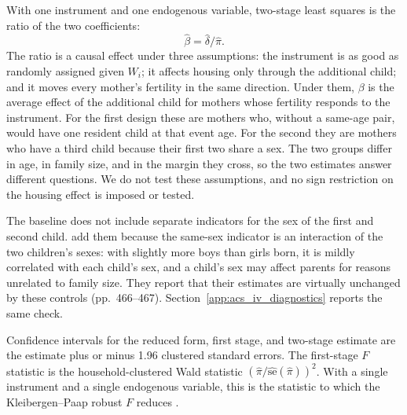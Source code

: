 With one instrument and one endogenous variable, two-stage least squares is the
ratio of the two coefficients:
\begin{equation}
\hat\beta=\hat\delta/\hat\pi .
\label{eq:acsiv_ratio}
\end{equation}
The ratio is a causal effect under three assumptions: the instrument is as good as
randomly assigned given $W_i$; it affects housing only through the additional
child; and it moves every mother's fertility in the same direction. Under them,
$\beta$ is the average effect of the additional child for mothers whose fertility
responds to the instrument. For the first design these are mothers who, without a
same-age pair, would have one resident child at that event age. For the second they
are mothers who have a third child because their first two share a sex. The two
groups differ in age, in family size, and in the margin they cross, so the two
estimates answer different questions. We do not test these assumptions, and no
sign restriction on the housing effect is imposed or tested.

The baseline does not include separate indicators for the sex of the first and
second child. \citet[pp.~460--461]{angrist1998children} add them because the
same-sex indicator is an interaction of the two children's sexes: with slightly
more boys than girls born, it is mildly correlated with each child's sex, and a
child's sex may affect parents for reasons unrelated to family size. They report
that their estimates are virtually unchanged by these controls (pp.~466--467).
Section~\ref{app:acs_iv_diagnostics} reports the same check.

Confidence intervals for the reduced form, first stage, and two-stage estimate are
the estimate plus or minus 1.96 clustered standard errors. The first-stage $F$
statistic is the household-clustered Wald statistic
$(\hat\pi/\widehat{\mathrm{se}}(\hat\pi))^2$. With a single instrument and a single
endogenous variable, this is the statistic to which the Kleibergen--Paap robust
$F$ reduces \citep[pp.~16--17]{andrews2018weak}.

